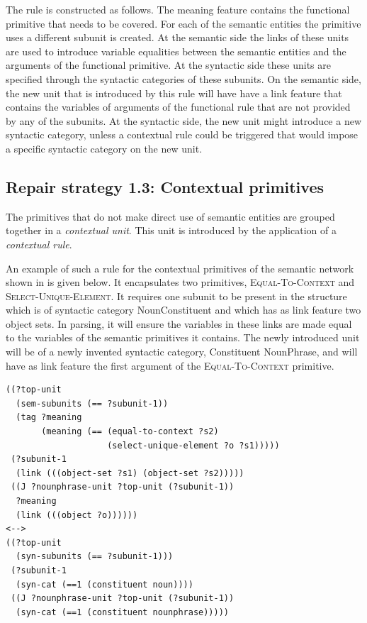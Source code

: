The rule is constructed as follows. The meaning feature contains the
functional primitive that needs to be covered. For each of the
semantic entities the primitive uses a different subunit is
created. At the semantic side the links of these units are used to
introduce variable equalities between the semantic entities and the
arguments of the functional primitive. At the syntactic side these
units are specified through the syntactic categories of these
subunits.  On the semantic side, the new unit that is introduced by
this rule will have have a link feature that contains the variables of
arguments of the functional rule that are not provided by any of the
subunits. At the syntactic side, the new unit might introduce a new
syntactic category, unless a contextual rule could be triggered that
would impose a specific syntactic category on the new unit.

\subsection{Repair strategy 1.3: Contextual primitives}

The primitives that do not make direct use of semantic entities are
grouped together in a \emph{contextual unit}. This unit is introduced
by the application of a \emph{contextual rule}. 

An example of such a rule for the contextual primitives of the
semantic network shown in  is given
below. It encapsulates two primitives, \textsc{Equal-To-Context} and
\textsc{Select-Unique-Element}. It requires one subunit to be present
in the structure which is of syntactic category NounConstituent and
which has as link feature two object sets. In parsing, it will ensure
the variables in these links are made equal to the variables of the
semantic primitives it contains. The newly introduced unit will be of
a newly invented syntactic category, Constituent NounPhrase, and will
have as link feature the first argument of the
\textsc{Equal-To-Context} primitive.

\footnotesize
{}
\begin{lstlisting}
((?top-unit
  (sem-subunits (== ?subunit-1))
  (tag ?meaning
       (meaning (== (equal-to-context ?s2) 
                    (select-unique-element ?o ?s1)))))
 (?subunit-1 
  (link (((object-set ?s1) (object-set ?s2)))))
 ((J ?nounphrase-unit ?top-unit (?subunit-1))
  ?meaning
  (link (((object ?o))))))
<-->
((?top-unit 
  (syn-subunits (== ?subunit-1)))
 (?subunit-1 
  (syn-cat (==1 (constituent noun))))
 ((J ?nounphrase-unit ?top-unit (?subunit-1))
  (syn-cat (==1 (constituent nounphrase)))))
\end{lstlisting}
\normalsize

